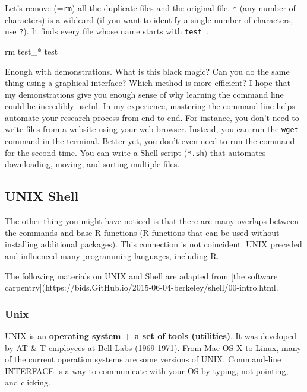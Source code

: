 \documentclass[
  letterpaper,
  DIV=11,
  numbers=noendperiod]{scrreprt}
\newenvironment{Shaded}{\begin{snugshade}}{\end{snugshade}}
\newcommand{\FunctionTok}[1]{\textcolor[rgb]{0.28,0.35,0.67}{#1}}
\newcommand{\NormalTok}[1]{\textcolor[rgb]{0.00,0.23,0.31}{#1}}
\newcommand{\PreprocessorTok}[1]{\textcolor[rgb]{0.68,0.00,0.00}{#1}}
\begin{document}
Let's remove (=\texttt{rm}) all the duplicate files and the original
file. \texttt{*} (any number of characters) is a wildcard (if you want
to identify a single number of characters, use \texttt{?}). It finds
every file whose name starts with \texttt{test\_}.

\begin{Shaded}
\begin{Highlighting}[]
\FunctionTok{rm}\NormalTok{ test\_}\PreprocessorTok{*}\NormalTok{ test }
\end{Highlighting}
\end{Shaded}

Enough with demonstrations. What is this black magic? Can you do the
same thing using a graphical interface? Which method is more efficient?
I hope that my demonstrations give you enough sense of why learning the
command line could be incredibly useful. In my experience, mastering the
command line helps automate your research process from end to end. For
instance, you don't need to write files from a website using your web
browser. Instead, you can run the \texttt{wget} command in the terminal.
Better yet, you don't even need to run the command for the second time.
You can write a Shell script (\texttt{*.sh}) that automates downloading,
moving, and sorting multiple files.

\hypertarget{unix-shell}{%
\subsection*{UNIX Shell}\label{unix-shell}}

The other thing you might have noticed is that there are many overlaps
between the commands and base R functions (R functions that can be used
without installing additional packages). This connection is not
coincident. UNIX preceded and influenced many programming languages,
including R.

The following materials on UNIX and Shell are adapted from {[}the
software
carpentry{]}(https://bids.GitHub.io/2015-06-04-berkeley/shell/00-intro.html.

\hypertarget{unix}{%
\subsubsection*{Unix}\label{unix}}

UNIX is an \textbf{operating system + a set of tools (utilities)}. It
was developed by AT \& T employees at Bell Labs (1969-1971). From Mac OS
X to Linux, many of the current operation systems are some versions of
UNIX. Command-line INTERFACE is a way to communicate with your OS by
typing, not pointing, and clicking.
\end{document}
